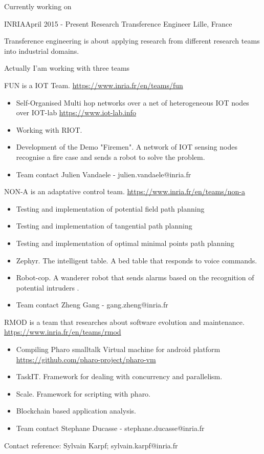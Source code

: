 \documentclass{resume} %
\begin{document}
\begin{rSection}{Currently working on}


\begin{rSubsection}{INRIA}{April 2015 - Present }{ Research Transference Engineer }{Lille, France}
	\item Transference engineering is about applying research from different research teams into industrial domains. 
	\item Actually I'am working with three teams
	\item FUN is a IOT Team.   \url{https://www.inria.fr/en/teams/fun}
		\begin{itemize}
			\item  Self-Organised Multi hop networks over a net of heterogeneous IOT nodes over IOT-lab \url{https://www.iot-lab.info}
			\item Working with RIOT.
			\item Development of the Demo "Firemen". A network of IOT sensing nodes recognise a fire case and sends a robot to solve the problem.
			\item Team contact Julien Vandaele - julien.vandaele@inria.fr
		\end{itemize}
	\item NON-A is an adaptative control team.   \url{https://www.inria.fr/en/teams/non-a}
			\begin{itemize}
				\item Testing and implementation of potential field path planning
				\item Testing and implementation of tangential path planning
				\item Testing and implementation of optimal minimal points path planning		
				\item Zephyr. The intelligent table. A bed table that responds to voice commands.
				\item Robot-cop. A wanderer robot that sends alarms based on the recognition of potential intruders . 	
				\item Team contact Zheng Gang - gang.zheng@inria.fr
			\end{itemize}
		
	\item RMOD is a team that researches about software evolution and maintenance.  \url{https://www.inria.fr/en/teams/rmod}
			\begin{itemize}
				\item Compiling Pharo smalltalk Virtual machine for android platform \url{https://github.com/pharo-project/pharo-vm}
				\item TaskIT. Framework for dealing with concurrency and parallelism. 
				\item Scale. Framework for scripting with pharo. 
				\item Blockchain based application analysis. 
				\item Team contact Stephane Ducasse - stephane.ducasse@inria.fr
			\end{itemize}
	\item Contact reference: Sylvain Karpf; sylvain.karpf@inria.fr


\end{rSubsection}
\end{rSection}
\end{document}
